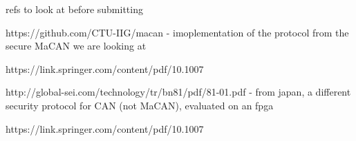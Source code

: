 refs to look at before submitting

https://github.com/CTU-IIG/macan - imoplementation of the protocol from the secure MaCAN we are looking at

https://link.springer.com/content/pdf/10.1007%

http://global-sei.com/technology/tr/bn81/pdf/81-01.pdf - from japan, a different security protocol for CAN (not MaCAN), evaluated on an fpga

https://link.springer.com/content/pdf/10.1007%